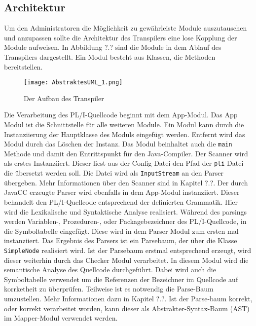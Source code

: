 

\subsection{Architektur} 


Um den Administratoren die Möglichkeit zu gewährleiste Module auszutauschen und anzupassen sollte die Architektur des Transpilers eine lose Kopplung der Module aufweisen. In Abbildung ?.? sind die Module in dem Ablauf des Transpilers dargestellt. Ein Modul besteht aus Klassen, die Methoden bereitstellen.

\begin{figure}[h]
	\centering
	\caption{Der Aufbau des Transpiler}
	\texttt{[image: AbstraktesUML\_1.png]}
	\label{fig:modules}
\end{figure}

Die Verarbeitung des PL/I-Quellcode beginnt mit dem App-Modul. Das App Modul ist die Schnittstelle für alle weiteren Module. Ein Modul kann durch die Instanziierung der Hauptklasse des Moduls eingefügt werden. Entfernt wird das Modul durch das Löschen der Instanz. Das Modul beinhaltet auch die \verb+main+ Methode und damit den Entrittspunkt für den Java-Compiler.
Der Scanner wird als erstes Instanziiert. Dieser liest aus der Config-Datei den Pfad der \verb+pli+ Datei die übersetzt werden soll. Die Datei wird als \verb+InputStream+ an den Parser übergeben. Mehr Informationen über den Scanner sind in Kapitel ?.?.
Der durch JavaCC erzeugte Parser wird ebenfalls in dem App-Modul instanziiert. Dieser behandelt den PL/I-Quellcode entsprechend der definierten Grammatik. Hier wird die Lexikalische und Syntaktische Analyse realisiert.
Während des parsings werden Variablen-, Prozeduren-, oder Packagebezeichner des PL/I-Quellcode, in die Symboltabelle eingefügt. Diese wird in dem Parser Modul zum ersten mal instanziiert. 
Das Ergebnis des Parsers ist ein Parsebaum, der über die Klasse \verb+SimpleNode+ realisiert wird. 
Ist der Parsebaum erstmal entsprechend erzeugt, wird dieser weiterhin durch das Checker Modul verarbeitet. In diesem Modul wird die semantische Analyse des Quellcode durchgeführt. Dabei wird auch die Symboltabelle verwendet um die Referenzen der Bezeichner im Quellcode auf korrketheit zu überprüfen. Teilweise ist es notwendig die Parse-Baum umzustellen. Mehr Informationen dazu in Kapitel ?.?. Ist der Parse-baum korrekt, oder korrekt verarbeitet worden, kann dieser als Abstrakter-Syntax-Baum (AST) im Mapper-Modul verwendet werden.

